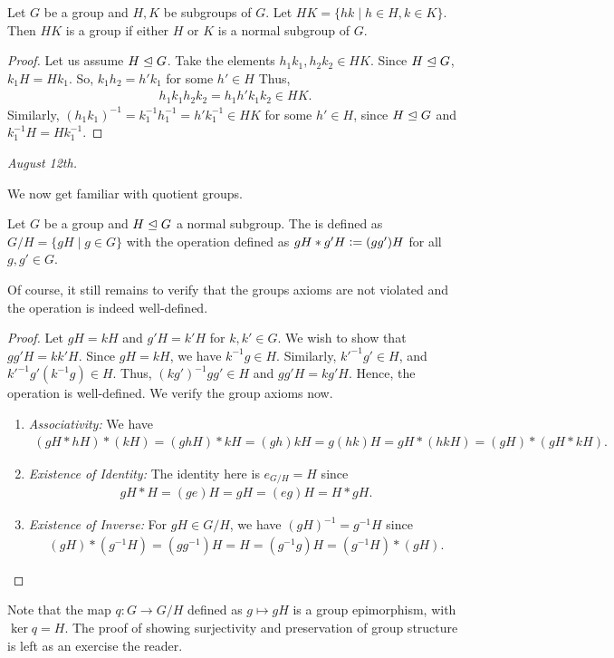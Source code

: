 Let $G$ be a group and $H,K$ be subgroups of $G$. Let $HK = \{hk \mid h \in H,k \in K\}$. Then $HK$ is a group if either $H$ or $K$ is a normal subgroup of $G$.
\begin{proof}
    Let us assume $H \trianglelefteq G$. Take the elements $h_{1}k_{1},h_{2}k_{2} \in HK$. Since $H \trianglelefteq G$, $k_{1}H = Hk_{1}$. So, $k_{1}h_{2} = h'k_{1}$ for some $h' \in H$ Thus,
    \begin{align}
        h_{1}k_{1}h_{2}k_{2} = h_{1}h'k_{1}k_{2} \in HK.
    \end{align}
    Similarly, $(h_{1}k_{1})^{-1} = k_{1}^{-1}h_{1}^{-1} = h'k_{1}^{-1} \in HK$ for some $h' \in H$, since $H \trianglelefteq G$ and $k_{1}^{-1}H =  Hk_{1}^{-1}$.
\end{proof}

\textit{August 12th.}

We now get familiar with quotient groups.
\begin{definition}
    Let $G$ be a group and $H \trianglelefteq G$ a normal subgroup. The  is defined as $G/H = \{gH \mid g \in G\}$ with the operation defined as $gH \ast g'H \vcentcolon= (gg')H$ for all $g,g' \in G$.
\end{definition}
Of course, it still remains to verify that the groups axioms are not violated and the operation is indeed well-defined.
\begin{proof}
    Let $gH = kH$ and $g'H = k'H$ for $k,k' \in G$. We wish to show that $gg'H = kk'H$. Since $gH = kH$, we have $k^{-1}g \in H$. Similarly, $k'^{-1}g' \in H$, and $k'^{-1}g'(k^{-1}g) \in H$. Thus, $(k g')^{-1}gg' \in H$ and $gg'H = kg'H$. Hence, the operation is well-defined. We verify the group axioms now.
    \begin{enumerate}
        \item \textit{Associativity:} We have
        \begin{align}
            (gH \ast hH) \ast (kH) = (ghH) \ast kH = (gh)kH = g(hk)H = gH \ast (hkH) = (gH) \ast (gH \ast kH).
        \end{align}

        \item \textit{Existence of Identity:} The identity here is $e_{G/H} = H$ since
        \begin{align}
            gH \ast H = (g e) H = gH = (e g) H = H \ast gH.
        \end{align}

        \item \textit{Existence of Inverse:} For $gH \in G/H$, we have $(gH)^{-1} = g^{-1}H$ since
        \begin{align}
            (gH) \ast (g^{-1}H) = (g g^{-1})H = H = (g^{-1} g) H = (g^{-1}H) \ast (gH).
        \end{align}
    \end{enumerate}
\end{proof}
\noindent Note that the map $q:G \to G/H$ defined as $g \mapsto gH$ is a group epimorphism, with $\ker q = H$. The proof of showing surjectivity and preservation of group structure is left as an exercise the reader.

